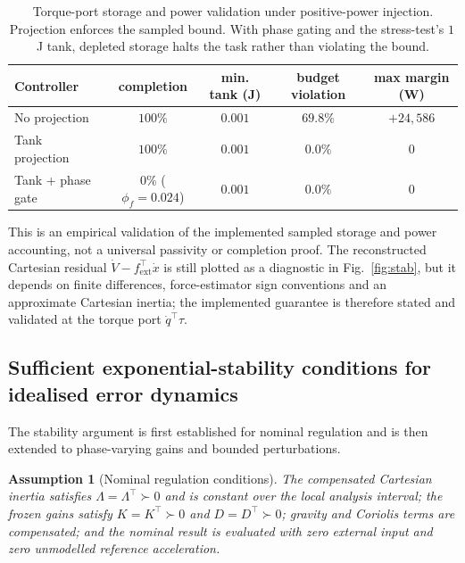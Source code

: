 \documentclass[11pt,a4paper]{article}
\newtheorem{assumption}{Assumption}
\begin{document}
\begin{table}[h]
\centering
\begin{tabular}{lcccc}
\toprule
Controller & completion & min. tank (J) & budget violation & max margin (W)\\
\midrule
No projection & $100\%$ & $0.001$ & $69.8\%$ & $+24{,}586$\\
Tank projection & $100\%$ & $0.001$ & $0.0\%$ & $0$\\
Tank + phase gate & $0\%$ ($\phi_f=0.024$) & $0.001$ & $0.0\%$ & $0$\\
\bottomrule
\end{tabular}
\caption{Torque-port storage and power validation under positive-power
injection. Projection enforces the sampled bound. With phase gating and the
stress-test's $1$\,J tank, depleted storage halts the task rather than violating
the bound.}
\label{tab:pass_adv}
\end{table}

This is an empirical validation of the implemented sampled storage and power
accounting, not a universal passivity or completion proof. The
reconstructed Cartesian residual $\dot V-f_{\text{ext}}^\top\dot x$ is still
plotted as a diagnostic in Fig.~\ref{fig:stab}, but it depends on finite
differences, force-estimator sign conventions and an approximate Cartesian
inertia; the implemented guarantee is therefore stated and validated at the
torque port $\dot q^\top\tau$.

\subsection{Sufficient exponential-stability conditions for idealised error dynamics}
The stability argument is first established for nominal regulation and is then
extended to phase-varying gains and bounded perturbations.

\begin{assumption}[Nominal regulation conditions]
\label{ass:nominal_stability}
The compensated Cartesian inertia satisfies
$\Lambda=\Lambda^\top\succ0$ and is constant over the local analysis interval;
the frozen gains satisfy $K=K^\top\succ0$ and $D=D^\top\succ0$; gravity and
Coriolis terms are compensated; and the nominal result is evaluated with zero
external input and zero unmodelled reference acceleration.
\end{assumption}
\end{document}
